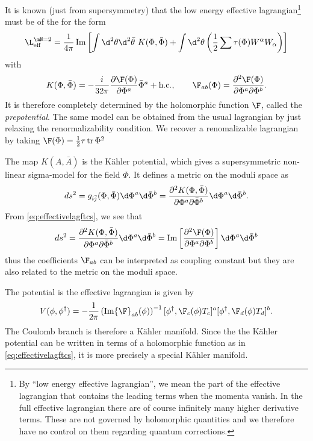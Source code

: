 \documentclass{worksheetclass}
\begin{document}
        It is known (just from supersymmetry) that the low energy effective lagrangian\footnote{By ``low energy effective lagrangian'', we mean the part of the effective lagrangian that contains the leading terms when the momenta vanish. In the full effective lagrangian there are of course infinitely many higher derivative terms. These are not governed by holomorphic quantities and we therefore have no control on them regarding quantum corrections.} must be of the for the form
        \begin{equation}
            \L^{\mN=2}_{\text{eff}} = \frac{1}{4\pi}\Im\left[\int\d^2\theta\d^2\bar{\theta}~K(\Phi,\bar{\Phi})+\int\d^2\theta\left(\frac{1}{2}\sum\tau(\Phi)W^\alpha W_\alpha\right)\right]
        \end{equation}
        with
        \begin{equation}
            K(\Phi,\bar{\Phi})=-\frac{i}{32\pi}\pdv{\F(\Phi)}{\Phi^a}\bar{\Phi}^a+\text{h.c.},\qquad \F_{ab}(\Phi)=\pdv{\F(\Phi)}{\Phi^a}{\Phi^b}.\label{eq:effectivelagftcs}
        \end{equation}
        It is therefore completely determined by the holomorphic function $\F$, called the \emph{prepotential}. The same model can be obtained from the usual lagrangian by just relaxing the renormalizability condition. We recover a renomalizable lagrangian by taking $\F(\Phi)=\frac{1}{2}\tau\tr\Phi^2$

        The map $K(A,\bar{A})$ is the Kähler potential, which gives a supersymmetric non-linear sigma-model for the field $\Phi$. It defines a metric on the moduli space as
        \begin{equation}
            ds^2=g_{i\bar{j}}(\Phi,\bar{\Phi})\d\Phi^a\d\bar{\Phi}^b = \pdv{K(\Phi,\bar{\Phi})}{\Phi^a}{\bar{\Phi}^b}\d\Phi^a\d\bar{\Phi}^b.
        \end{equation}
        From \eqref{eq:effectivelagftcs}, we see that 
        \begin{equation}
            ds^2=\pdv{K(\Phi,\bar{\Phi})}{\Phi^a}{\bar{\Phi}^b}\d\Phi^a\d\bar{\Phi}^b = \Im\left[\pdv{\F(\Phi)}{\Phi^a}{\Phi^b}\right]\d\Phi^a\d\bar{\Phi}^b
        \end{equation}
        thus the coefficients $\F_{ab}$ can be interpreted as coupling constant but they are also related to the metric on the moduli space.

        The potential is the effective lagrangian is given by
        \begin{equation}
            V(\phi,\phi^\dagger)=-\frac{1}{2\pi}\left(\Im\F_{ab}(\phi)\right)^{-1}[\phi^\dagger,\F_c(\phi)T_c]^a[\phi^\dagger,\F_d(\phi)T_d]^b.
        \end{equation}
        The Coulomb branch is therefore a Kähler manifold. Since the the Kähler potential can be written in terms of a holomorphic function as in \eqref{eq:effectivelagftcs}, it is more precisely a special Kähler manifold.
\end{document}
